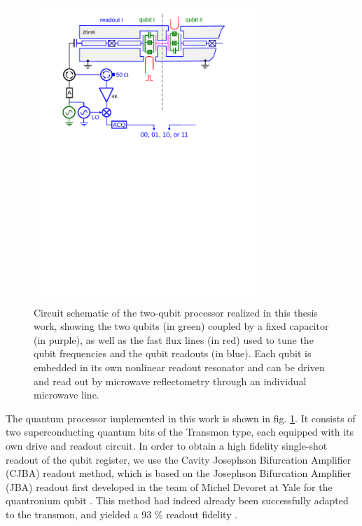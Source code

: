 %
\begin{figure}[ht!]
 \centering \includegraphics[width=0.75\textwidth]{./material/papers/grover/figures/2_qubit_processor_schematic}
\caption[Circuit schematic of the realized two-qubit processor]{Circuit schematic of the two-qubit processor realized in this thesis work, showing the two qubits (in green) coupled by
a fixed capacitor (in purple), as well as the fast flux lines (in
red) used to tune the qubit frequencies and the qubit readouts (in
blue). Each qubit is embedded in its own nonlinear readout resonator
and can be driven and read out by microwave reflectometry through an individual microwave line.}


\label{fig:two_qubit_processor_schematic} %
\end{figure}


The quantum processor implemented in this work is shown in fig. \ref{fig:two_qubit_processor_schematic}.
It consists of two superconducting quantum bits of the Transmon type,
each equipped with its own drive and readout circuit. In order to
obtain a high fidelity single-shot readout of the qubit register,
we use the Cavity Josephson Bifurcation Amplifier (CJBA) readout method, which is based on the Josephson Bifurcation Amplifier (JBA) readout first
developed in the team of Michel Devoret at Yale for the quantronium
qubit \citep{siddiqi_rf-driven_2004,vijay_invited_2009,siddiqi_dispersive_2006}. This method
had indeed already been successfully adapted to the transmon, and
yielded a 93 \% readout fidelity \citep{mallet_single-shot_2009}.

